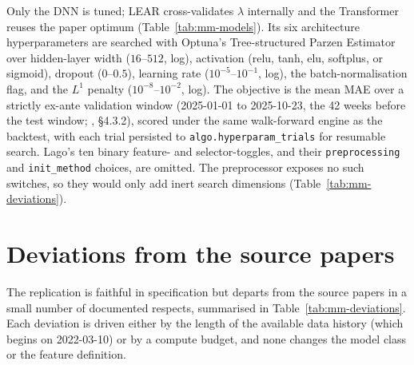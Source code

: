 Only the DNN is tuned; LEAR cross-validates $\lambda$ internally and the
Transformer reuses the paper optimum (Table~\ref{tab:mm-models}). Its six
architecture hyperparameters are searched with Optuna's Tree-structured Parzen
Estimator over hidden-layer width ($16$--$512$, log), activation
(relu, tanh, elu, softplus, or sigmoid), dropout ($0$--$0.5$), learning rate
($10^{-5}$--$10^{-1}$, log), the batch-normalisation flag, and the $L^1$ penalty
($10^{-8}$--$10^{-2}$, log). The objective is the mean MAE over a strictly
ex-ante validation window (2025-01-01 to 2025-10-23, the 42 weeks before the test
window; \cite{lago2021}, \S4.3.2), scored under the same walk-forward engine as
the backtest, with each trial persisted to \texttt{algo.hyperparam\_trials} for
resumable search. Lago's ten binary feature- and selector-toggles, and their
\texttt{preprocessing} and \texttt{init\_method} choices, are omitted. The
preprocessor exposes no such switches, so they would only add inert search
dimensions (Table~\ref{tab:mm-deviations}).

\section{Deviations from the source papers}
\label{sec:mm-deviations}

The replication is faithful in specification but departs from the source papers
in a small number of documented respects, summarised in
Table~\ref{tab:mm-deviations}. Each deviation is driven either by the length of
the available data history (which begins on 2022-03-10) or by a compute budget,
and none changes the model class or the feature definition.

